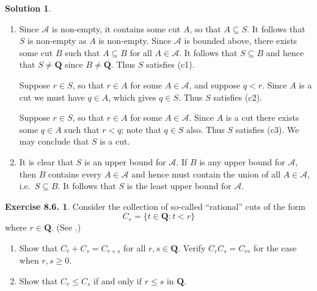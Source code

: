 \documentclass[12pt]{article}
\theoremstyle{definition}
\theoremstyle{exercise}
\newtheorem{exercise}{Exercise 8.6.}
\theoremstyle{solution}
\newtheorem*{solution}{Solution}
\newcommand{\Q}{\mathbf{Q}}
\begin{document}
\begin{solution}
    \begin{enumerate}
        \item Since \( \mathcal{A} \) is non-empty, it contains some cut \( A \), so that \( A \subseteq S \). It follows that \( S \) is non-empty as \( A \) is non-empty. Since \( \mathcal{A} \) is bounded above, there exists some cut \( B \) such that \( A \subseteq B \) for all \( A \in \mathcal{A} \). It follows that \( S \subseteq B \) and hence that \( S \neq \Q \) since \( B \neq \Q \). Thus \( S \) satisfies (c1).

        Suppose \( r \in S \), so that \( r \in A \) for some \( A \in \mathcal{A} \), and suppose \( q < r \). Since \( A \) is a cut we must have \( q \in A \), which gives \( q \in S \). Thus \( S \) satisfies (c2).

        Suppose \( r \in S \), so that \( r \in A \) for some \( A \in \mathcal{A} \). Since \( A \) is a cut there exists some \( q \in A \) such that \( r < q \); note that \( q \in S \) also. Thus \( S \) satisfies (c3). We may conclude that \( S \) is a cut.

        \item It is clear that \( S \) is an upper bound for \( \mathcal{A} \). If \( B \) is any upper bound for \( \mathcal{A} \), then \( B \) contains every \( A \in \mathcal{A} \) and hence must contain the union of all \( A \in \mathcal{A} \), i.e.\ \( S \subseteq B \). It follows that \( S \) is the least upper bound for \( \mathcal{A} \).
    \end{enumerate}
\end{solution}

\begin{exercise}
\label{ex:9}
    Consider the collection of so-called ``rational'' cuts of the form
    \[
        C_r = \{ t \in \Q : t < r \}
    \]
    where \( r \in \Q \). (See .)
    \begin{enumerate}
        \item Show that \( C_r + C_s = C_{r+s} \) for all \( r, s \in \Q \). Verify \( C_r C_s = C_{rs} \) for the case when \( r, s \geq 0 \).

        \item Show that \( C_r \leq C_s \) if and only if \( r \leq s \) in \( \Q \).
    \end{enumerate}
\end{exercise}
\end{document}
